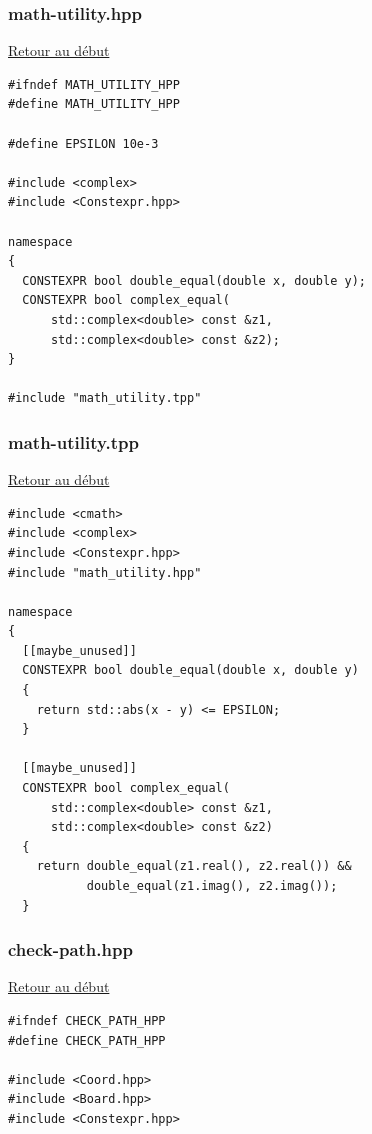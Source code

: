 {\begin{frame}[fragile]
\begin{verbatim}
\end{verbatim}
\end{frame}

\begin{frame}[fragile]
\label{mathutility.hpp}
\frametitle{math-utility.hpp}
\hyperlink{conclusion}{Retour au début}\newline
\begin{verbatim}
#ifndef MATH_UTILITY_HPP
#define MATH_UTILITY_HPP

#define EPSILON 10e-3

#include <complex>
#include <Constexpr.hpp>

namespace
{
  CONSTEXPR bool double_equal(double x, double y);
  CONSTEXPR bool complex_equal(
      std::complex<double> const &z1,
      std::complex<double> const &z2);
}

#include "math_utility.tpp"

\end{verbatim}
\end{frame}

\begin{frame}[fragile]
\label{mathutility.tpp}
\frametitle{math-utility.tpp}
\hyperlink{conclusion}{Retour au début}\newline
\begin{verbatim}
#include <cmath>
#include <complex>
#include <Constexpr.hpp>
#include "math_utility.hpp"

namespace
{
  [[maybe_unused]]
  CONSTEXPR bool double_equal(double x, double y)
  {
    return std::abs(x - y) <= EPSILON;
  }

  [[maybe_unused]]
  CONSTEXPR bool complex_equal(
      std::complex<double> const &z1,
      std::complex<double> const &z2)
  {
    return double_equal(z1.real(), z2.real()) &&
           double_equal(z1.imag(), z2.imag());
  }

\end{verbatim}
\end{frame}

\begin{frame}[fragile]
\label{checkpath.hpp}
\frametitle{check-path.hpp}
\hyperlink{conclusion}{Retour au début}\newline
\begin{verbatim}
#ifndef CHECK_PATH_HPP
#define CHECK_PATH_HPP

#include <Coord.hpp>
#include <Board.hpp>
#include <Constexpr.hpp>


\end{verbatim}
\end{frame}}
